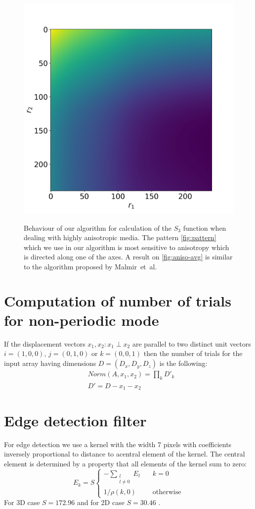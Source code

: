 \documentclass[reprint,amsmath,amssymb,aps,pre,showkeys,showpacs]{revtex4-1}
\begin{document}
\begin{figure}[tp]
{    \includegraphics[width=0.3\linewidth]{images/aniso-avg-s3.png}
    \label{fig:aniso-avg}}
  \caption[]{Behaviour of our algorithm for calculation of the $S_3$ function
    when dealing with highly anisotropic media. The pattern \cref{fig:pattern}
    which we use in our algorithm is most sensitive to anisotropy which is
    directed along one of the axes. A result on \cref{fig:aniso-avg} is similar
    to the algorithm proposed by Malmir~et~al.}
  \label{fig:aniso}
\end{figure}

\appendix
\section{Computation of number of trials for non-periodic mode}
\label{sec:number-of-trials}
If the displacement vectors $x_1, x_2: x_1 \perp x_2$ are parallel to two
distinct unit vectors $i=(1,0,0)$, $j=(0,1,0)$ or $k=(0,0,1)$ then the number of
trials for the input array having dimensions $D = (D_x, D_y, D_z)$ is the
following:
\begin{equation}
  \begin{aligned}
    & Norm(A, x_1, x_2) = \prod_k D'_k \\
    & D' = D - x_1 - x_2
  \end{aligned}
\end{equation}

\section{Edge detection filter}
\label{sec:filter}
For edge detection we use a kernel with the width 7 pixels with coefficients
inversely proportional to distance to acentral element of the kernel. The
central element is determined by a property that all elements of the kernel sum
to zero:
\begin{equation}
  E_k = S \left\{
  \begin{array}{ll}
    -\sum\limits_{\substack{l \\ l \ne 0}} E_l & \quad k = 0 \\
    1 / \rho(k, 0) & \quad \text{otherwise}
  \end{array}
  \right.
\end{equation}
For 3D case $S=172.96$ and for 2D case $S=30.46$ \cite{postnicov20232}.


\end{document}
